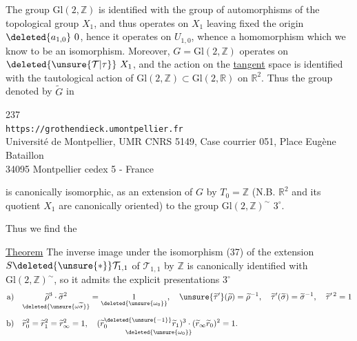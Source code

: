The group $\mathrm{Gl}(2,\mathbb Z)$ is identified with the group of automorphisms of the topological group $X_1$, and thus operates on $X_1$ leaving fixed the origin $\deleted{a_{1,0}}\ 0$, hence it operates on $U_{1,0}$, whence a homomorphism
which we know to be an isomorphism. Moreover, $G=\mathrm{Gl}(2,\mathbb Z)$ operates  on $\deleted{\unsure{\mathcal T|\tau}}\ X_1$, and the action on the \uline{tangent} space is identified with the tautological action of $\mathrm{Gl}(2,\mathbb Z)\subset\mathrm{Gl}(2,\mathbb R)$ on $\mathbb R^2$. Thus the group denoted by $\widetilde G$ in


\begin{center}
237\\
\texttt{https://grothendieck.umontpellier.fr}\\
Université de Montpellier, UMR CNRS 5149, Case courrier 051, Place Eugène Bataillon\\
34095 Montpellier cedex 5 - France
\end{center}


  is canonically isomorphic, as an extension of $G$ by $T_0=\mathbb Z$ (N.B. $\mathbb R^2$ and its quotient $X_1$ are canonically oriented) to the group $\mathrm{Gl}(2,\mathbb Z)^\sim$  $3^\circ$.

Thus we find   the

\uline{Theorem} The inverse image under the isomorphism (37) of the extension $S\deleted{\unsure{*}}\mathcal T_{1,1}$ of $\mathcal T_{1,1}$ by $\mathbb Z$ is canonically identified with $\mathrm{Gl}(2,\mathbb Z)^\sim$, so it admits the  explicit presentations  $3^\circ$
\[
\begin{aligned}
\text{a)}\quad &
\underset{\deleted{\unsure{\omega\widetilde\sigma}}}{\widetilde\rho^{3}\cdot\widetilde\sigma^{2}}
=\underset{\deleted{\unsure{\omega_0}}}{1},\quad
\unsure{\widetilde\tau'}(\widetilde\rho)=\widetilde\rho^{-1},\quad
\widetilde\tau'(\widetilde\sigma)=\widetilde\sigma^{-1},\quad
\widetilde\tau'^{\,2}=1
\\[1ex]
\text{b)}\quad &
\widetilde r_0^{2}=\widetilde r_1^{2}=\widetilde r_\infty^{2}=1,\quad
\underset{\deleted{\unsure{\omega_0}}}{
(\widetilde r_0^{\deleted{\unsure{-1}}}\widetilde r_1)^3\cdot
(\widetilde r_\infty\widetilde r_0)^2}=1.
\end{aligned}
\]

